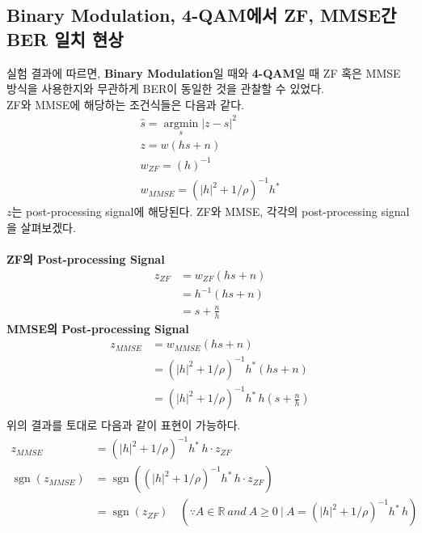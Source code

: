 \documentclass{article}
\newcommand{\bd}{\textbf} %
\providecommand{\abs}[1]{\lvert#1\rvert}
\newcommand{\sgn}{\operatorname{sgn}}
\begin{document}
\subsection{Binary Modulation, 4-QAM에서 ZF, MMSE간 BER 일치 현상}
실험 결과에 따르면, \bd{Binary Modulation}일 때와 \bd{4-QAM}일 때 ZF 혹은 MMSE 방식을 사용한지와 무관하게 BER이 동일한 것을 관찰할 수 있었다.\\
ZF와 MMSE에 해당하는 조건식들은 다음과 같다.
\begin{gather}
\hat{s}=\operatorname*{argmin}_s \abs{z-s}^2\\
z=w(hs+n)\\
w_{ZF}=(h)^{-1}\\
w_{MMSE}=(\abs{h}^2+1/\rho)^{-1}h^*
\end{gather}
$z$는 post-processing signal에 해당된다. ZF와 MMSE, 각각의 post-processing signal을 살펴보겠다.\\
\\
\bd{ZF의 Post-processing Signal}
\begin{equation}
\begin{split}
z_{ZF}&=w_{ZF}(hs+n)\\
&=h^{-1}(hs+n)\\
&=s+\frac{n}{h}
\end{split}
\end{equation}
\bd{MMSE의 Post-processing Signal}
\begin{equation}
\begin{split}
z_{MMSE}&=w_{MMSE}(hs+n)\\
&=(\abs{h}^2+1/\rho)^{-1}h^*(hs+n)\\
&=(\abs{h}^2+1/\rho)^{-1}h^*\, h(s+\frac{n}{h})\\
\end{split}
\end{equation}
위의 결과를 토대로 다음과 같이 표현이 가능하다.
\begin{equation}
\begin{split}
z_{MMSE}&=(\abs{h}^2+1/\rho)^{-1}h^*\,h\cdot z_{ZF}\\
\sgn(z_{MMSE}) &= \sgn((\abs{h}^2+1/\rho)^{-1}h^*\,h\cdot z_{ZF})\\
&=\sgn(z_{ZF})\quad (\because A\in\mathbb{R}\ and\ A \geq 0\ |\ A= (\abs{h}^2+1/\rho)^{-1}h^*\,h)\\
\end{split}
\end{equation}
\end{document}
